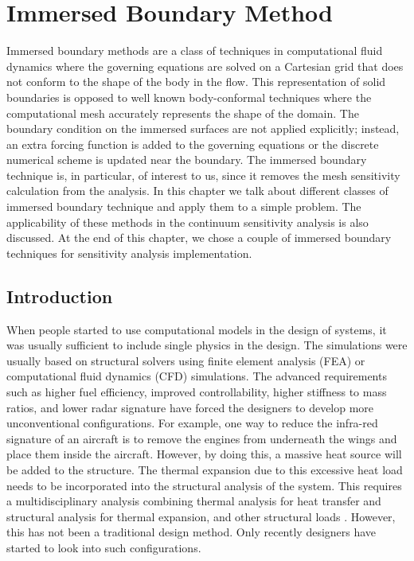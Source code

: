 \chapter{Immersed Boundary Method}\label{ch:immersedBoundary}
Immersed boundary methods are a class of techniques in computational fluid dynamics where the governing equations are solved on a Cartesian grid that does not conform to the shape of the body in the flow. This representation of solid boundaries is opposed to well known body-conformal techniques where the computational mesh accurately represents the shape of the domain. The boundary condition on the immersed surfaces are not applied explicitly; instead, an extra forcing function is added to the governing equations or the discrete numerical scheme is updated near the boundary. The immersed boundary technique is, in particular, of interest to us, since it removes the mesh sensitivity calculation from the analysis. In this chapter we talk about different classes of immersed boundary technique and apply them to a simple problem. The applicability of these methods in the continuum sensitivity analysis is also discussed. At the end of this chapter, we chose a couple of immersed boundary techniques for sensitivity analysis implementation.
\section{Introduction}
When people started to use computational models in the design of systems, it was usually sufficient to include single physics in the design. The simulations were usually based on structural solvers using finite element analysis (FEA) or computational fluid dynamics (CFD) simulations. The advanced requirements such as higher fuel efficiency, improved controllability, higher stiffness to mass ratios, and lower radar signature have forced the designers to develop more unconventional configurations. For example, one way to reduce the infra-red signature of an aircraft is to remove the engines from underneath the wings and place them inside the aircraft. However, by doing this, a massive heat source will be added to the structure. The thermal expansion due to this excessive heat load needs to be incorporated into the structural analysis of the system. This requires a multidisciplinary analysis combining thermal analysis for heat transfer and structural analysis for thermal expansion, and other structural loads \cite{deaton2013stiffening}. However, this has not been a traditional design method. Only recently designers have started to look into such configurations.

